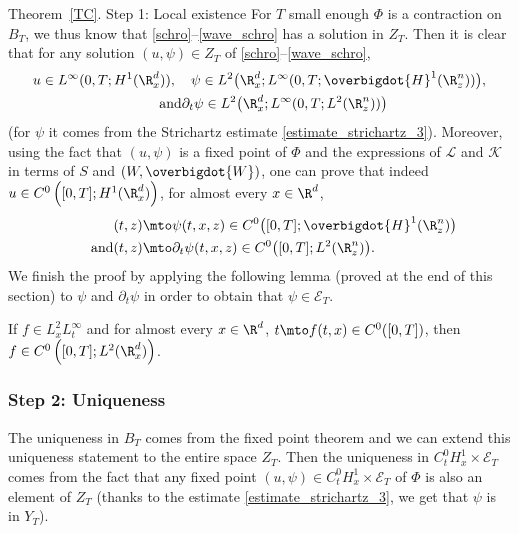 \begin{ProofOf}{Theorem~\ref{TC}. Step 1: Local existence} For $T$ small enough $\Phi$ is a contraction on $B_{T}$, we thus know that \eqref{schro}--\eqref{wave_schro} has a solution in $Z_{T}$. Then it is clear that for any solution $(u,\psi)\in Z_{T}$ of \eqref{schro}--\eqref{wave_schro},
\begin{gather*}
u\in L^{\infty}(0,T;H^{1}(\R_{x}^{d})),\quad \psi\in L^{2}\bigl(\R_{x}^{d};L^{\infty}(0,T;\overbigdot{H}^{1}(\R_{z}^{n}))\bigr),\\
\tag*{and} \partial_{t}\psi\in L^{2}\bigl(\R_{x}^{d};L^{\infty}(0,T;L^{2}(\R_{z}^{n}))\bigr)
\end{gather*}
(for $\psi$ it comes from the Strichartz estimate \eqref{estimate_strichartz_3}). Moreover, using the fact that $(u,\psi)$ is a fixed point of $\Phi$ and the expressions of $\mathcal{L}$ and $\mathcal{K}$ in terms of $S$ and $(W,\overbigdot{W})$, one can prove that indeed $u\in C^{0}\left([0,T];H^{1}(\R_{x}^{d})\right)$, for almost every $x\in\R^{d}$,\vspace*{-3pt}
\begin{align*}
(t,z)&\mto \psi(t,x,z)\in C^{0}\bigl([0,T];\overbigdot{H}^{1}(\R_{z}^{n})\bigr)\\
\tag*{and}
(t,z)&\mto\partial_{t}\psi(t,x,z)\in C^{0}\bigl([0,T];L^{2}(\R_{z}^{n})\bigr).
\end{align*}
We finish the proof by applying the following lemma (proved at the end of this section) to $\psi$ and $\partial_{t}\psi$ in order to obtain that $\psi\in\mathcal{E}_{T}$.
\begin{lemma}\label{lemma_continuity}
If $f\in L_{x}^{2}L_{t}^{\infty}$ and for almost every $x\in\R^{d}$, $t\mto f(t,x)\in C^{0}([0,T])$, then $f\in C^{0}\left([0,T];L^{2}(\R_{x}^{d})\right)$.
\end{lemma}

\subsubsection*{Step 2: Uniqueness} The uniqueness in $B_{T}$ comes from the fixed point theorem and we can extend this uniqueness statement to the entire space $Z_{T}$. Then the uniqueness in $C_{t}^{0}H_{x}^{1}\times\mathcal{E}_{T}$ comes from the fact that any fixed point $(u,\psi)\in C_{t}^{0}H_{x}^{1}\times\mathcal{E}_{T}$ of $\Phi$ is also an element of $Z_{T}$ (thanks to the estimate \eqref{estimate_strichartz_3}, we get that $\psi$ is in $Y_{T}$).


\end{ProofOf}
